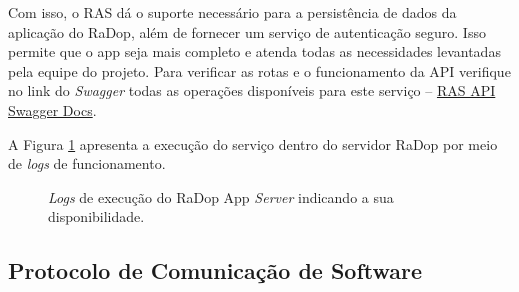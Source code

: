 Com isso, o RAS dá o suporte necessário para a persistência de dados da aplicação do RaDop, além de fornecer um serviço de autenticação seguro. Isso permite que o app seja mais completo e atenda todas as necessidades levantadas pela equipe do projeto. Para verificar as rotas e o funcionamento da API verifique no link do \textit{Swagger} todas as operações disponíveis para este serviço -- \href{https://app.swaggerhub.com/apis-docs/sconetto/RaDop_App_Server/1.0.0-ALPHA}{RAS API Swagger Docs}.

A Figura \ref{fig:radop-app-server} apresenta a execução do serviço dentro do servidor RaDop por meio de \textit{logs} de funcionamento.

\begin{figure}[H]
	\caption{\label{fig:radop-app-server} \textit{Logs} de execução do RaDop App \textit{Server} indicando a sua disponibilidade.}
\end{figure}

\subsection{Protocolo de Comunicação de Software}

